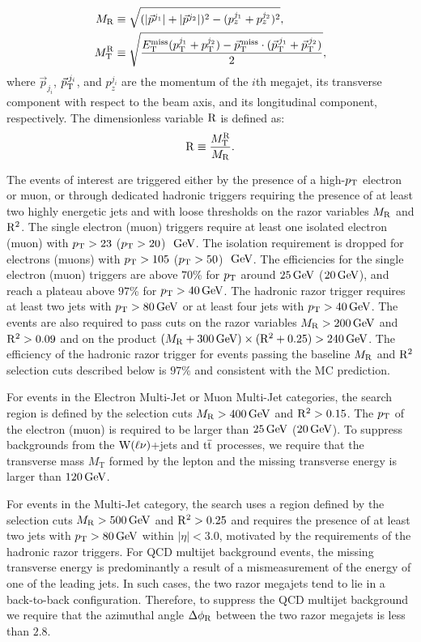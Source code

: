 \begin{align}
 \label{eq:MRstar}
 M_\mathrm{R} &\equiv
 \sqrt{
(\lvert \vec{p}^{j_{1}} \rvert+\lvert \vec{p}^{j_{2}} \rvert)^2 -({p}^{j_1}_z+{p}^{j_2}_z)^2},\\
M_\mathrm{T}^\mathrm{R} &\equiv \sqrt{ \frac{E_{\mathrm{T}}^{\text{miss}}(p_{\mathrm{T}}^{j_1}+p_{\mathrm{T}}^{j_2}) -
{\vec p}_{\mathrm{T}}^{\kern1pt\text{miss}} \cdot
 ({\vec p}_{\mathrm{T}}^{\,j_1}+{\vec p}_{\mathrm{T}}^{\,j_2}) }{2}},
\end{align}
where $\vec{p}_{j_i}$, ${\vec p}_{\mathrm{T}}^{\,j_i}$, and
$p^{j_i}_z$ are the momentum of the $i$th megajet, its
transverse component with respect to the beam axis, and its
longitudinal component, respectively.  The dimensionless variable $\mathrm{R}$ is defined as:
\begin{equation}
\mathrm{R} \equiv \frac{M_\mathrm{T}^\mathrm{R}}{M_\mathrm{R}}.
\end{equation}


The events of interest are triggered either by the presence of a high-$p_{\mathrm{T}}$ electron or muon, or 
through dedicated hadronic triggers requiring the presence of at least two highly energetic jets 
and with loose thresholds on the razor variables $M_\mathrm{R}$ and $\mathrm{R}^2$. The single 
electron (muon) triggers require at least one isolated electron 
(muon) with $p_{\mathrm{T}}>23$ ($p_{\mathrm{T}}>20$)~$\,\text{Ge\hspace{-.08em}V}$. The isolation requirement is dropped for electrons (muons) with 
$p_{\mathrm{T}}>105$ ($p_{\mathrm{T}}>50$)~$\,\text{Ge\hspace{-.08em}V}$. The efficiencies for the single electron (muon) triggers
are above $70$\% for $p_{\mathrm{T}}$ around $25 \,\text{Ge\hspace{-.08em}V}$ ($20 \,\text{Ge\hspace{-.08em}V}$), and reach a plateau above $97$\% for $p_{\mathrm{T}}>40 \,\text{Ge\hspace{-.08em}V}$. 
The hadronic razor trigger requires at least two jets with $p_{\mathrm{T}} > 80 \,\text{Ge\hspace{-.08em}V}$ or at least 
four jets with $p_{\mathrm{T}} > 40 \,\text{Ge\hspace{-.08em}V}$. The events are also required to pass cuts on the 
razor variables $M_\mathrm{R}>200\,\text{Ge\hspace{-.08em}V}$ and $\mathrm{R}^2>0.09$ and on the product 
$(M_\mathrm{R} + 300 \,\text{Ge\hspace{-.08em}V})\times(\mathrm{R}^2 + 0.25)>240 \,\text{Ge\hspace{-.08em}V}$.
The efficiency of the hadronic razor trigger for events passing the baseline
$M_\mathrm{R}$ and $\mathrm{R}^2$ selection cuts described below is $97\%$ and consistent with
the MC prediction.

For events in the Electron Multi-Jet or Muon Multi-Jet categories, the search region 
is defined by the selection cuts $M_\mathrm{R} > 400 \,\text{Ge\hspace{-.08em}V}$ and $\mathrm{R}^2 > 0.15$. 
The $p_{\mathrm{T}}$ of the electron (muon)
is required to be larger than $25 \,\text{Ge\hspace{-.08em}V}$ ($20 \,\text{Ge\hspace{-.08em}V}$). To suppress backgrounds from the $\mathrm{W}(\ell\nu)$+jets
and $\mathrm{t}\overline{\mathrm{t}}$ processes, we require that the transverse mass $M_{\mathrm{T}}$ formed by the lepton
and the missing transverse energy is larger than $120 \,\text{Ge\hspace{-.08em}V}$. 

For events in the Multi-Jet category, the search uses a region defined by the 
selection cuts $M_\mathrm{R} > 500 \,\text{Ge\hspace{-.08em}V}$ and $\mathrm{R}^2 > 0.25$ and requires the presence of at least 
two jets with $p_{\mathrm{T}} >80 \,\text{Ge\hspace{-.08em}V}$ within $|\eta|<3.0$, motivated by the requirements 
of the hadronic razor triggers. For QCD multijet background events, the missing transverse 
energy is predominantly a result 
of a mismeasurement of the energy of one of the leading jets.  In such cases, the two razor 
megajets tend to lie in a back-to-back configuration. Therefore, to suppress the QCD multijet 
background we require that the azimuthal angle $\Delta\phi_\mathrm{R}$ between the two razor
megajets is less than $2.8$. 

